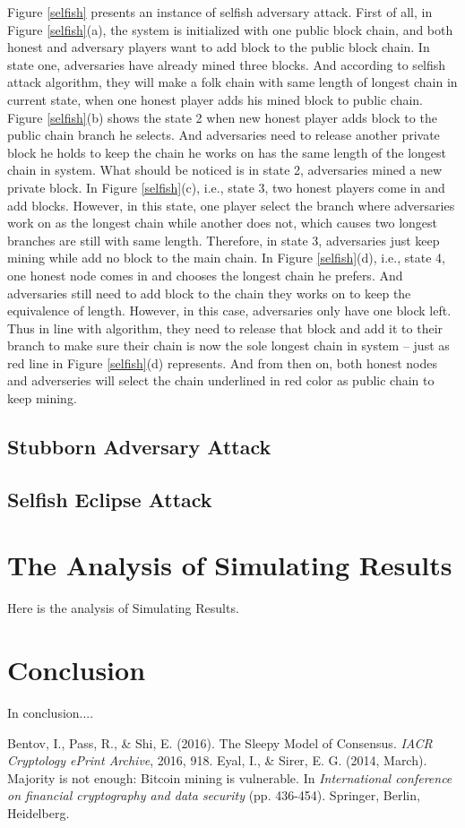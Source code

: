 \documentclass{llncs}
\begin{document}
Figure \ref{selfish} presents an instance of selfish adversary attack. 
First of all, in Figure \ref{selfish}(a), the system is initialized with one public block chain, and both honest and adversary players want to add block to the public block chain. In state one, adversaries have already mined three blocks. And according to selfish attack algorithm, they will make a folk chain with same length of longest chain in current state, when one honest player adds his mined block to public chain. Figure \ref{selfish}(b) shows the state 2 when new honest player adds block to the public chain branch he selects. And adversaries need to release another private block he holds to keep the chain he works on has the same length of the longest chain in system. What should be noticed is in state 2, adversaries mined a new private block. In Figure \ref{selfish}(c), i.e., state 3, two honest players come in and add blocks. However, in this state, one player select the branch where adversaries work on as the longest chain while another does not, which causes two longest branches are still with same length. Therefore, in state 3, adversaries just keep mining while add no block to the main chain. In Figure \ref{selfish}(d), i.e., state 4, one honest node comes in and chooses the longest chain he prefers. And adversaries still need to add block to the chain they works on to keep the equivalence of length. However, in this case, adversaries only have one block left. Thus in line with algorithm, they need to release that block and add it to their branch to make sure their chain is now the sole longest chain in system -- just as red line in Figure \ref{selfish}(d) represents. And from then on, both honest nodes and adverseries will select the chain underlined in red color as public chain to keep mining.

\subsection{Stubborn Adversary Attack}

\subsection{Selfish Eclipse Attack}
%
\section{The Analysis of Simulating Results}
Here is the analysis of Simulating Results.
\section{Conclusion}
In conclusion....


\begin{thebibliography}{}  %

Bentov, I., Pass, R., \& Shi, E. (2016). The Sleepy Model of Consensus. \emph{IACR Cryptology ePrint Archive}, 2016, 918.
Eyal, I., \& Sirer, E. G. (2014, March). Majority is not enough: Bitcoin mining is vulnerable. In \emph{International conference on financial cryptography and data security} (pp. 436-454). Springer, Berlin, Heidelberg.

\end{thebibliography}
%
\end{document}

